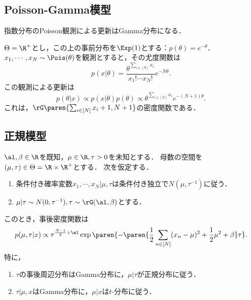 \documentclass[uplatex,dvipdfmx]{jsreport}
\begin{document}
\subsection{Poisson-Gamma模型}

\begin{tcolorbox}[colframe=ForestGreen, colback=ForestGreen!10!white,breakable,colbacktitle=ForestGreen!40!white,coltitle=black,fonttitle=\bfseries\sffamily,
title=]
    指数分布のPoisson観測による更新はGamma分布になる．
\end{tcolorbox}

\begin{proposition}
    $\Theta=\R^+$とし，この上の事前分布を$\Exp(1)$とする：$p(\theta)=e^{-\theta}$．
    $x_1,\cdots,x_N\sim\Pois(\theta)$を観測とすると，その尤度関数は
    \[p(x|\theta)=\frac{\theta^{\sum_{i\in[N]} x_i}}{x_1!\cdots x_N!}e^{-N\theta}.\]
    この観測による更新は
    \[p(\theta|x)\propto p(x|\theta)p(\theta)\propto \theta^{\sum_{i\in [N]}x_i}e^{-(N+1)\theta}.\]
    これは，$\rG\paren{\sum_{i\in[N]}x_i+1,N+1}$の密度関数である．
\end{proposition}

\subsection{正規模型}

\begin{proposition}
    $\al,\beta\in\R$を既知，$\mu\in\R,\tau>0$を未知とする．
    母数の空間を$(\mu,\tau)\in\Theta=\R\times\R^+$とする．
    次を仮定する．
    \begin{enumerate}[({A}1)]
        \item 条件付き確率変数$x_1,\cdots,x_N|\mu,\tau$は条件付き独立で$N(\mu,\tau^{-1})$に従う．
        \item $\mu|\tau\sim N(0,\tau^{-1}),\tau\sim\rG(\al,\beta)$とする．
    \end{enumerate}
    このとき，事後密度関数は
    \[p(\mu,\tau|x)\propto \tau^{\frac{N-1}{2}+\al}\exp\paren{-\paren{\frac{1}{2}\sum_{n\in [N]}(x_n-\mu)^2+\frac{1}{2}\mu^2+\beta}\tau}.\]
    特に，
    \begin{enumerate}
        \item $\tau$の事後周辺分布はGamma分布に，$\mu|\tau$が正規分布に従う．
        \item $\tau|\mu,x$はGamma分布に，$\mu|x$は$t$-分布に従う．
    \end{enumerate}
\end{proposition}
\end{document}
